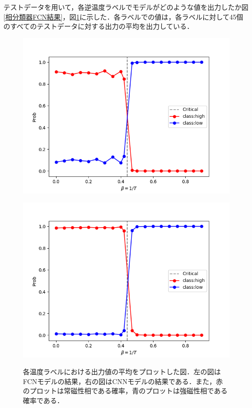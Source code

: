 \documentclass[a4paper,11pt]{jsreport}
\begin{document}
テストデータを用いて，各逆温度ラベルでモデルがどのような値を出力したか図\ref{相分類器FCN結果}，図\ref{相分類器CNN結果}に示した．各ラベルでの値は，各ラベルに対して45個のすべてのテストデータに対する出力の平均を出力している．
\begin{figure}[H]
  \begin{minipage}[b]{0.45\linewidth}
    \begin{center}
      \includegraphics[keepaspectratio, scale=0.4]{image/plot_square_FCNN.png}
      \label{相分類器FCN結果}
    \end{center}
  \end{minipage}
  \begin{minipage}[b]{0.45\linewidth}
    \begin{center}
      \includegraphics[keepaspectratio, scale=0.4]{image/plot_square_CNN.png}
      \label{相分類器CNN結果}
    \end{center}
  \end{minipage}
  \caption{各温度ラベルにおける出力値の平均をプロットした図．左の図はFCNモデルの結果，右の図はCNNモデルの結果である．また，赤のプロットは常磁性相である確率，青のプロットは強磁性相である確率である．}
\end{figure}
\end{document}
